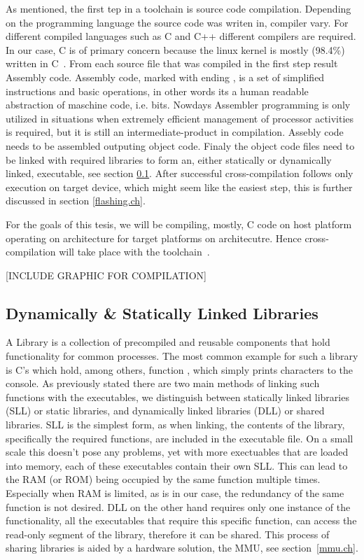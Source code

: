 As mentioned, the first tep in a toolchain is source code compilation. Depending on the programming language the source code was writen in, compiler vary. For different compiled languages such as C and C++ different compilers are required. In our case, C is of primary concern because the linux kernel is mostly (98.4\%) written in C~\cite{githubLinux}. From each source file that was compiled in the first step result Assembly code. Assembly code, marked with ending , is a set of simplified instructions and basic operations, in other words its a human readable abstraction of maschine code, i.e. bits.
Nowdays Assembler programming is only utilized in situations when extremely efficient management of processor activities is required, but it is still an intermediate-product in compilation. Assebly code needs to be assembled outputing object code. Finaly the object code files need to be linked with required libraries to form an, either statically or dynamically linked, executable, see section \ref{dsll}. After successful cross-compilation follows only execution on target device, which might seem like the easiest step, this is further discussed in section \ref{flashing.ch}.

For the goals of this tesis, we will be compiling, mostly, C code on host platform operating on  architecture for target platforms on  architecutre. Hence cross-compilation will take place with the  toolchain~\cite{gcc-arm-none-eabi}.

[INCLUDE GRAPHIC FOR COMPILATION]

\subsection{Dynamically \& Statically Linked Libraries}\label{dsll}
A Library is a collection of precompiled and reusable components that hold functionality for common processes. The most common example for such a library is C's  which hold, among others, function , which simply prints characters to the console. As previously stated there are two main methods of linking such functions with the executables, we distinguish between statically linked libraries (SLL) or static libraries, and dynamically linked libraries (DLL) or shared libraries. SLL is the simplest form, as when linking, the contents of the library, specifically the required functions, are included in the executable file. On a small scale this doesn't pose any problems, yet with more exectuables that are loaded into memory, each of these executables contain their own SLL. This can lead to the RAM (or ROM) being occupied by the same function multiple times. Especially when RAM is limited, as is in our case, the redundancy of the same function is not desired. DLL on the other hand requires only one instance of the functionality, all the executables that require this specific function, can access the read-only segment of the library, therefore it can be shared. This process of sharing libraries is aided by a hardware solution, the MMU, see section~\ref{mmu.ch}.

